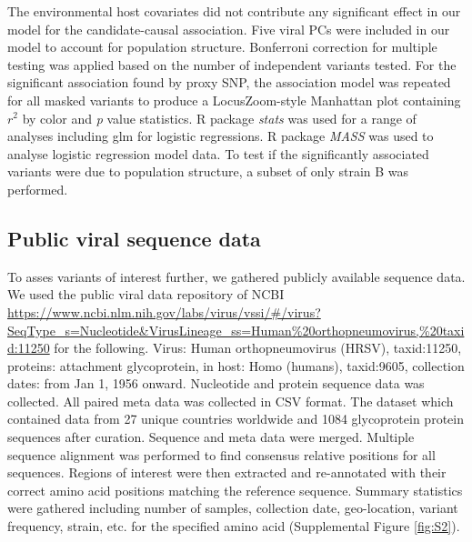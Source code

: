 \documentclass{article} %
\begin{document}
The environmental host covariates did not contribute any significant effect in our model for the candidate-causal association.
Five viral PCs were included in our model to account for population structure.
Bonferroni correction for multiple testing was applied based on the number of independent variants tested.
For the significant association found by proxy SNP, the association model was repeated for all masked variants to produce a LocusZoom-style Manhattan plot containing $r^2$ by color and \textit{p} value statistics.
R package \textit{stats} was used for a range of analyses including glm for logistic regressions. 
R package \textit{MASS} was used to analyse logistic regression model data.
To test if the significantly associated variants were due to population structure, 
a subset of only strain B was performed. 

\subsection{Public viral sequence data}
To asses variants of interest further, we gathered publicly available sequence data.
We used the public viral data repository of 
NCBI \url{https://www.ncbi.nlm.nih.gov/labs/virus/vssi/#/virus?SeqType_s=Nucleotide&VirusLineage_ss=Human\%20orthopneumovirus,\%20taxid:11250}
for the following.
Virus: Human orthopneumovirus (HRSV), taxid:11250, 
proteins: attachment glycoprotein,
in host: Homo (humans), taxid:9605,
collection dates: from Jan 1, 1956 onward.
Nucleotide and protein sequence data was collected.
All paired meta data was collected in CSV format.
The dataset which contained data from 27 unique countries worldwide and 1084 glycoprotein protein sequences after curation.
Sequence and meta data were merged.
Multiple sequence alignment was performed to find consensus relative positions for all sequences. 
Regions of interest were then extracted and re-annotated with their correct amino acid positions matching the reference sequence.
Summary statistics were gathered including number of samples, collection date, geo-location, variant frequency, strain, etc. for the specified amino acid
(Supplemental Figure \ref{fig:S2}).
\end{document}

